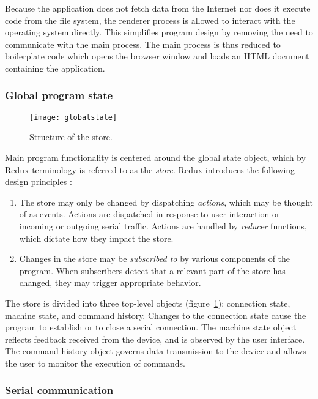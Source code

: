 Because the application does not fetch data from the Internet nor does it
execute code from the file system, the renderer process is allowed to interact
with the operating system directly. This simplifies program design by removing
the need to communicate with the main process. The main process is thus reduced
to boilerplate code which opens the browser window and loads an HTML document
containing the application.

\subsubsection{Global program state}

\begin{figure}[ht]
    \begin{center}
        \texttt{[image: globalstate]}
        \caption{Structure of the store.}
        \label{store}
    \end{center}
\end{figure}

Main program functionality is centered around the global state object, which
by Redux terminology is referred to as the \textit{store}. Redux introduces the
following design principles \cite{redux}:
\begin{enumerate}
    \item The store may only be changed by dispatching \textit{actions}, which
    may be thought of as events. Actions are dispatched in response to user
    interaction or incoming or outgoing serial traffic. Actions are handled
    by \textit{reducer} functions, which dictate how they impact the store.
    \item Changes in the store may be \textit{subscribed to} by various
    components of the program. When subscribers detect that a relevant part
    of the store has changed, they may trigger appropriate behavior.
\end{enumerate}

The store is divided into three top-level objects (figure~\ref{store}):
connection state, machine state, and command history. Changes to the connection
state cause the program to establish or to close a serial connection. The
machine state object reflects feedback received from the device, and is observed
by the user interface. The command history object governs data transmission
to the device and allows the user to monitor the execution of commands.

\subsubsection{Serial communication}

